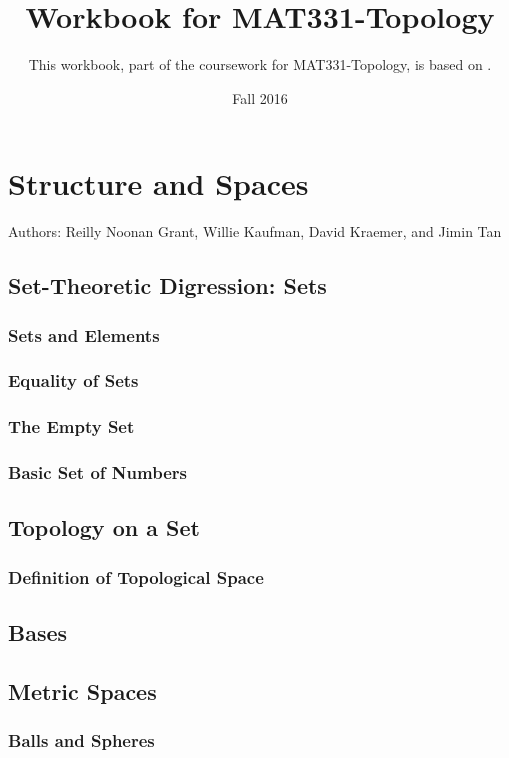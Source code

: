 \documentclass{book}
\title{Workbook for MAT331-Topology}
\date{Fall 2016}
\author{This workbook, part of the coursework for MAT331-Topology, is based on \cite{viro}.}
\begin{document}


\chapter{Structure and Spaces}
Authors: Reilly Noonan Grant, Willie Kaufman, David Kraemer, and Jimin Tan

\section{Set-Theoretic Digression: Sets}
\subsection{Sets and Elements}%
\subsection{Equality of Sets}%
\subsection{The Empty Set}%
\subsection{Basic Set of Numbers}%










\section{Topology on a Set}

\subsection{Definition of Topological Space}











%



\section{Bases}







\section{Metric Spaces} 
 
 
\subsection{Balls and Spheres}
 
 



\end{document}
